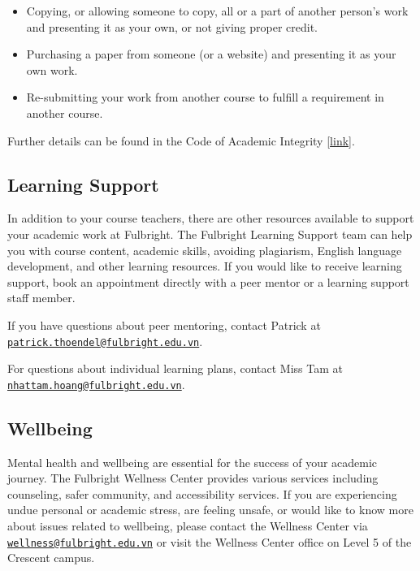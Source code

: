 \documentclass[
]{article}
\begin{document}
\begin{itemize}
\item
  Copying, or allowing someone to copy, all or a part of another person's work and presenting it as your own, or not giving proper credit.
\item
  Purchasing a paper from someone (or a website) and presenting it as your own work.
\item
  Re-submitting your work from another course to fulfill a requirement in another course.
\end{itemize}

Further details can be found in the Code of Academic Integrity {[}\href{https://fulbright.edu.vn/articles/Code\%20of\%20Academic\%20Integrity/Code\%20of\%20Academic\%20Integrity_\%20Excom\%20Endorsed.pdf}{link}{]}.

\hypertarget{learning-support}{%
\subsection*{Learning Support}\label{learning-support}}

In addition to your course teachers, there are other resources available to support your academic work at Fulbright. The Fulbright Learning Support team can help you with course content, academic skills, avoiding plagiarism, English language development, and other learning resources.
If you would like to receive learning support, book an appointment directly with a peer mentor or a learning support staff member.

If you have questions about peer mentoring, contact Patrick at \href{mailto:patrick.thoendel@fulbright.edu.vn}{\nolinkurl{patrick.thoendel@fulbright.edu.vn}}.

For questions about individual learning plans, contact Miss Tam at \href{mailto:nhattam.hoang@fulbright.edu.vn}{\nolinkurl{nhattam.hoang@fulbright.edu.vn}}.

\hypertarget{wellbeing}{%
\subsection*{Wellbeing}\label{wellbeing}}

Mental health and wellbeing are essential for the success of your academic journey. The
Fulbright Wellness Center provides various services including counseling, safer community,
and accessibility services. If you are experiencing undue personal or academic stress, are
feeling unsafe, or would like to know more about issues related to wellbeing, please contact
the Wellness Center via \href{mailto:wellness@fulbright.edu.vn}{\nolinkurl{wellness@fulbright.edu.vn}} or visit the Wellness Center office on
Level 5 of the Crescent campus.
\end{document}
